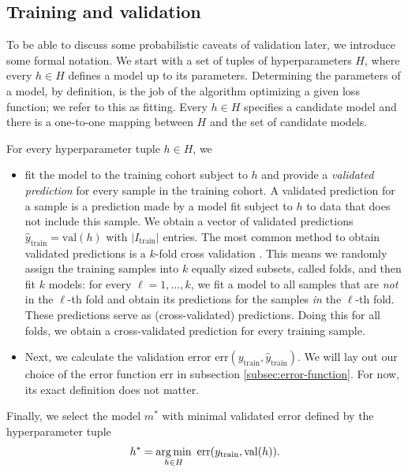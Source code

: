 \subsection{Training and validation}\label{subsec:train-val}

To be able to discuss some probabilistic caveats of validation later, we introduce some formal 
notation. We start with a set of tuples of hyperparameters $H$, where every $h \in H$ defines a model
up to its parameters. Determining the parameters of a model, by definition, is the job of the 
algorithm optimizing a given loss function; we refer to this as fitting. Every $h \in H$ specifies 
a candidate model and there is a one-to-one mapping between $H$ and the set of candidate models.

For every hyperparameter tuple $h \in H$, we
\begin{itemize}
    \item fit the model to the training cohort subject to $h$ and provide a
        \textit{validated prediction} for 
        every sample in the training cohort.
        A validated prediction for a sample is a prediction made by a model fit 
        subject to $h$ to data that does not include this sample. We obtain a vector of validated 
        predictions $\hat{y}_\text{train} = \text{val}(h)$ with $|I_\text{train}|$ entries.
        The most common method to obtain validated predictions is a $k$-fold cross validation 
        \cite{stone74}.
        This means we randomly assign the training samples into $k$ equally sized subsets, called 
        folds, and then fit $k$ models: for every $\ell = 1, \ldots, k$, we fit a model to all 
        samples that are \textit{not} in the $\ell$-th fold and obtain its predictions for the samples 
        \textit{in} the $\ell$-th fold. These predictions serve as (cross-validated) predictions. 
        Doing this for all 
        folds, we obtain a cross-validated prediction for every training sample.
    \item Next, we calculate the validation error 
        $\text{err}(y_\text{train}, \hat{y}_\text{train})$. We will lay out our choice of the 
        error function $\text{err}$ in subsection \ref{subsec:error-function}. For now, its 
        exact definition does not matter.
\end{itemize}
Finally, we select the model $m^*$ with minimal validated error defined by the hyperparameter tuple 
\begin{align}
    h^* = \operatorname*{arg\,min}_{h \in H} \ \text{err}(y_\text{train}, \text{val}(h)).
\end{align}

